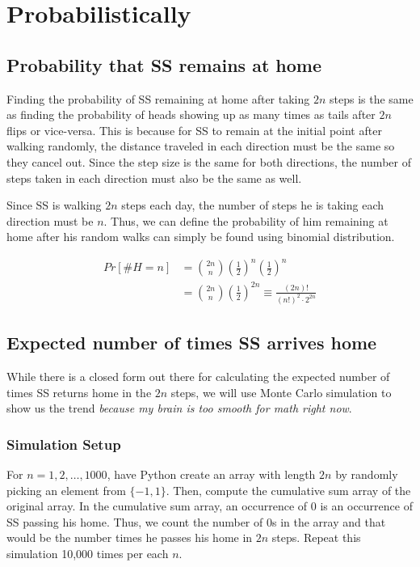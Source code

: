 \chapter{Probabilistically}

\section{Probability that SS remains at home}

Finding the probability of SS remaining at home after taking $2n$ steps is the same as finding the probability of heads showing up as many times as tails after $2n$ flips or vice-versa. This is because for SS to remain at the initial point after walking randomly, the distance traveled in each direction must be the same so they cancel out. Since the step size is the same for both directions, the number of steps taken in each direction must also be the same as well.

Since SS is walking $2n$ steps each day, the number of steps he is taking each direction must be $n$. Thus, we can define the probability of him remaining at home after his random walks can simply be found using binomial distribution.

\begin{equation}
\begin{aligned}
	Pr[\#H = n]
		&=\binom{2n}{n}\left(\frac{1}{2}\right)^n\left(\frac{1}{2}\right)^n \\
		&=\binom{2n}{n}\left(\frac{1}{2}\right)^{2n} \equiv \frac{(2n)!}{(n!)^2 \cdot 2^{2n}}
\end{aligned}
\end{equation}

\section{Expected number of times SS arrives home}

While there is a closed form out there for calculating the expected number of times SS returns home in the $2n$ steps,
we will use Monte Carlo simulation to show us the trend \textit{because my brain is too smooth for math right now}.

\subsection*{Simulation Setup}

For $n = 1, 2, \ldots, 1000$, have Python create an array with length $2n$ by randomly picking an element from $\{-1, 1\}$.
Then, compute the cumulative sum array of the original array.
In the cumulative sum array, an occurrence of $0$ is an occurrence of SS passing his home. Thus, we count the number of $0$s in the array and that would be the number times he passes his home in $2n$ steps. Repeat this simulation 10,000 times per each $n$.

